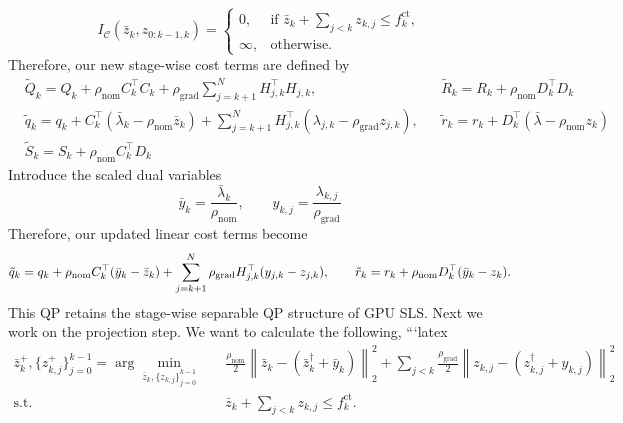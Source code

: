 \documentclass{article}
\begin{document}
\begin{equation}
    I_\mathcal{C}(\bar z_k, z_{0: k-1, k}) = \begin{cases}
        0, & \text{if } \bar z_k + \sum_{j < k} z_{k,j} \leq f_k^{\text{ct}}, \\
        \infty, & \text{otherwise}.
    \end{cases}
\end{equation}
Therefore, our new stage-wise cost terms are defined by
\begin{equation}
    \begin{aligned}
        & \tilde Q_k = Q_k + \rho_{\text{nom}} C^\top_k C_k + \rho_{\text{grad}} \sum_{j=k+1}^N H_{j,k}^\top H_{j,k}, && \tilde R_k = R_k + \rho_{\text{nom}} D_k^\top D_k \\
        & \tilde q_k = q_k + C_k^\top (\bar \lambda_k - \rho_{\text{nom}} \bar z_k) + \sum_{j=k+1}^N H_{j,k}^\top (\lambda_{j,k} - \rho_{\text{grad}} z_{j,k}), && \tilde r_k = r_k + D_k^\top (\bar \lambda - \rho_{\text{nom}} z_k) \\
        & \tilde S_k = S_k + \rho_{\text{nom}} C_k^\top D_k
    \end{aligned}
\end{equation}
Introduce the scaled dual variables
\begin{equation}
    \bar y_k = \frac{\bar \lambda_k}{\rho_{\text{nom}}}, \qquad y_{k,j} = \frac{\lambda_{k,j}}{\rho_\text{grad}}
\end{equation}
Therefore, our updated linear cost terms become
\begin{equation}
    \tilde q_k = q_k + \rho_{\text{nom}}C_k^\top (\bar y_k - \bar z_k) + \sum_{j=k+1}^N \rho_{\text{grad}}H_{j,k}^\top (y_{j,k} - z_{j,k}), \qquad \tilde r_k = r_k + \rho_{\text{nom}} D_k^\top (\bar y_k -  z_k). \\
\end{equation}
This QP retains the stage-wise separable QP structure of GPU SLS. Next we work on the projection step. We want to calculate the following,
```latex
\begin{equation}
    \begin{aligned}
        \bar z_k^+, \{z_{k,j}^+\}_{j=0}^{k-1}
        =
        \arg\min_{\bar z_k,\{z_{k,j}\}_{j=0}^{k-1}}
        \quad &
        \frac{\rho_{\mathrm{nom}}}{2}
        \left\|
            \bar z_k - \left(\bar z_k^\dagger + \bar y_k\right)
        \right\|_2^2
        +
        \sum_{j<k}
        \frac{\rho_{\mathrm{grad}}}{2}
        \left\|
            z_{k,j} - \left(z_{k,j}^\dagger + y_{k,j}\right)
        \right\|_2^2
        \\
        \text{s.t.}\quad &
        \bar z_k + \sum_{j<k} z_{k,j}
        \leq f_k^{\mathrm{ct}}.
    \end{aligned}
\end{equation}
\end{document}
